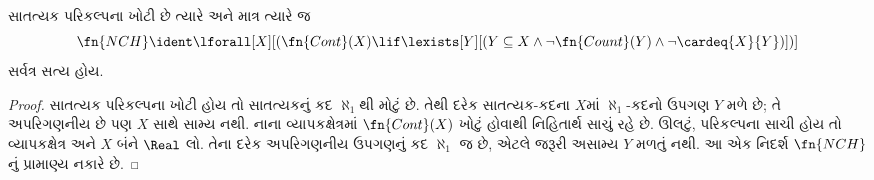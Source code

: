 \begin{prop}
સાતત્યક પરિકલ્પના ખોટી છે ત્યારે અને માત્ર ત્યારે જ
\[\fn{NCH} \ident
\lforall[X][(\fn{Cont}(X) \lif \lexists[Y][(Y \subseteq X \land \lnot
    \fn{Count}(Y) \land \lnot \cardeq{X}{Y})])]\]
સર્વત્ર સત્ય હોય.
\end{prop}
\begin{proof}
સાતત્યક પરિકલ્પના ખોટી હોય તો સાતત્યકનું કદ $\aleph_1$થી
મોટું છે. તેથી દરેક સાતત્યક-કદના $X$માં $\aleph_1$-કદનો
ઉપગણ $Y$ મળે છે; તે અપરિગણનીય છે પણ $X$ સાથે સામ્ય નથી.
નાના વ્યાપકક્ષેત્રમાં $\fn{Cont}(X)$ ખોટું હોવાથી નિહિતાર્થ
સાચું રહે છે. ઊલટું, પરિકલ્પના સાચી હોય તો વ્યાપકક્ષેત્ર અને
$X$ બંને $\Real$ લો. તેના દરેક અપરિગણનીય ઉપગણનું કદ
$\aleph_1$ જ છે, એટલે જરૂરી અસામ્ય $Y$ મળતું નથી.
આ એક નિદર્શ $\fn{NCH}$નું પ્રામાણ્ય નકારે છે.
\end{proof}
\endgroup


\OLEndChapterHook
\endgroup


\OLEndPartHook
